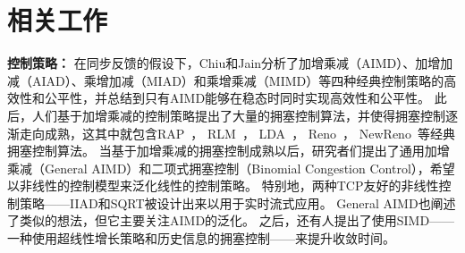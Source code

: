 \documentclass[winfonts]{njuthesis}
\begin{document}
\chapter{相关工作}\label{chapter:related works}

{\bf 控制策略：} 
在同步反馈的假设下，Chiu和Jain分析了加增乘减（AIMD）、加增加减（AIAD）、乘增加减（MIAD）和乘增乘减（MIMD）等四种经典控制策略的高效性和公平性，并总结到只有AIMD能够在稳态时同时实现高效性和公平性\cite{chiu1989analysis}。
此后，人们基于加增乘减的控制策略提出了大量的拥塞控制算法，并使得拥塞控制逐渐走向成熟，这其中就包含RAP~\cite{rejaie1999rap}， RLM~\cite{mccanne1996rlm}， LDA~\cite{sisalem1998lda}， Reno~\cite{jacobson1990modified}， NewReno~\cite{Henderson2012NewReno}等经典拥塞控制算法。
当基于加增乘减的拥塞控制成熟以后，研究者们提出了通用加增乘减（General AIMD）\cite{yang2000general}和二项式拥塞控制（Binomial Congestion Control）\cite{bansal2001binomial}，希望以非线性的控制模型来泛化线性的控制策略。
特别地，两种TCP友好的非线性控制策略——IIAD和SQRT被设计出来以用于实时流式应用\cite{bansal2001binomial}。
General AIMD\cite{yang2000general}也阐述了类似的想法，但它主要关注AIMD的泛化。
之后，还有人提出了使用SIMD——一种使用超线性增长策略和历史信息的拥塞控制——来提升收敛时间。
\end{document}
